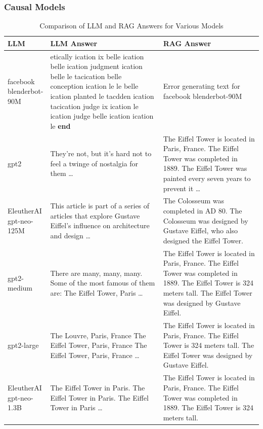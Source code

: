 \documentclass{wseas}
\begin{document}
\subsubsection{Causal Models}


\begin{table}[htbp]
\centering
\caption{Comparison of LLM and RAG Answers for Various Models} %
\begin{tabular}{|p{0.0977\linewidth}|p{0.4805\linewidth}|p{0.4219\linewidth}|}
\hline
\textbf{LLM} & \textbf{LLM Answer} & \textbf{RAG Answer} \\
\hline
facebook blenderbot-90M & etically ication ix belle ication belle ication judgment ication belle le tacication belle conception ication le le belle ication planted le tacdden ication tacication judge ix ication le ication judge belle ication ication le \textbf{end} & Error generating text for facebook blenderbot-90M \\
\hline
gpt2 & They're not, but it's hard not to feel a twinge of nostalgia for them \ldots{} & The Eiffel Tower is located in Paris, France. The Eiffel Tower was completed in 1889. The Eiffel Tower was painted every seven years to prevent it \ldots{} \\
\hline
EleutherAI gpt-neo-125M & This article is part of a series of articles that explore Gustave Eiffel's influence on architecture and design \ldots{} & The Colosseum was completed in AD 80. The Colosseum was designed by Gustave Eiffel, who also designed the Eiffel Tower. \\
\hline
gpt2-medium & There are many, many, many. Some of the most famous of them are: The Eiffel Tower, Paris \ldots{} & The Eiffel Tower is located in Paris, France. The Eiffel Tower was completed in 1889. The Eiffel Tower is 324 meters tall. The Eiffel Tower was designed by Gustave Eiffel. \\
\hline
gpt2-large & The Louvre, Paris, France The Eiffel Tower, Paris, France The Eiffel Tower, Paris, France \ldots{} & The Eiffel Tower is located in Paris, France. The Eiffel Tower is 324 meters tall. The Eiffel Tower was designed by Gustave Eiffel. \\
\hline
EleutherAI gpt-neo-1.3B & The Eiffel Tower in Paris. The Eiffel Tower in Paris. The Eiffel Tower in Paris \ldots{} & The Eiffel Tower is located in Paris, France. The Eiffel Tower was completed in 1889. The Eiffel Tower is 324 meters tall. \\
\hline
\end{tabular}
\end{table}
\end{document}
